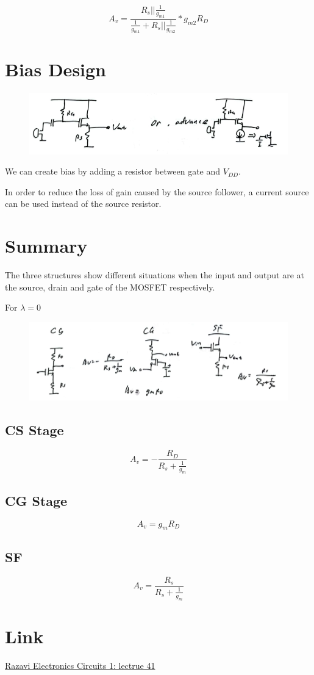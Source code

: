 \documentclass[fontset=windows]{article}
\begin{document}
$$A_v=\frac{R_s||\frac{1}{g_{m1}}}{\frac{1}{g_{m1}}+R_s||\frac{1}{g_{m2}}}*g_{m2}R_D$$

\section*{Bias Design}

\begin{figure}[htbp]
    \centering
    \includegraphics[scale=0.8]{10.jpg}
    \captionsetup{labelformat=empty}
    \caption{}
    \label{10}
\end{figure}

We can create bias by adding a resistor between gate and $V_{DD}$. 

In order to reduce the loss of gain caused by the source follower, a current source can be used instead of the source resistor. 

\section*{Summary}

The three structures show different situations when the input and output are at the source, drain and gate of the MOSFET respectively. 

For $\lambda =0$

\begin{figure}[htbp]
    \centering
    \includegraphics[scale=0.9]{11.jpg}
    \captionsetup{labelformat=empty}
    \caption{}
    \label{11}
\end{figure}

\subsection*{CS Stage}

$$A_v=-\frac{R_D}{R_s+\frac{1}{g_m}}$$

\subsection*{CG Stage}

$$A_v=g_mR_D$$

\subsection*{SF}

$$A_v=\frac{R_s}{R_s+\frac{1}{g_m}}$$

\section*{Link}

\href{https://www.bilibili.com/video/BV1FD4y1R7Ah?p=41&vd_source=1d0c07486a3bd3b0adb8ac548bf6453e}{Razavi Electronics Circuits 1: lectrue 41}
\end{document}
